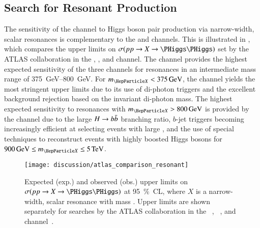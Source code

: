 

\subsection{Search for Resonant \HH Production}

The sensitivity of the \bbtautau channel to Higgs boson pair production via
narrow-width, scalar resonances is complementary to the \bbyy and \bbbb
channels. This is illustrated in , which compares
the upper limits on $\sigma(\pp \to X \to \HH)$ set by the ATLAS collaboration
in the \bbbb, \bbyy, and \bbtautau channel. The \bbtautau channel provides the
highest expected sensitivity of the three channels for resonances in an
intermediate mass range of \SIrange{375}{800}{\GeV}. For $\mX < \SI{375}{\GeV}$,
the \bbyy channel yields the most stringent upper limits due to its use of
di-photon triggers and the excellent background rejection based on the invariant
di-photon mass.
The highest expected sensitivity to resonances with $\mX > \SI{800}{\GeV}$ is
provided by the \bbbb channel due to the large $H \to b\bar{b}$ branching ratio,
$b$-jet triggers becoming increasingly efficient at selecting events with large
\mHH, and the use of special techniques to reconstruct events with highly
boosted Higgs bosons for $\SI{900}{\GeV} \leq \mX \leq \SI{5}{\TeV}$.

\begin{figure}[htbp]
  \centering

  \texttt{[image: discussion/atlas\_comparison\_resonant]}

  \caption{Expected (exp.) and observed (obs.) upper limits on
    $\sigma(\pp \to X \to \HH)$ at \SI{95}{\percent}~CL, where $X$ is a
    narrow-width, scalar resonance with mass \mX. Upper limits are shown
    separately for searches by the ATLAS collaboration in the \bbbb~\cite{HDBS-2018-41,hepdata.111124}, \bbyy~\cite{HDBS-2018-34,hepdata.105864}, and \bbtautau
    channel~\cite{HDBS-2018-40}.}%
  \label{fig:resonant_hh_limits}
\end{figure}

